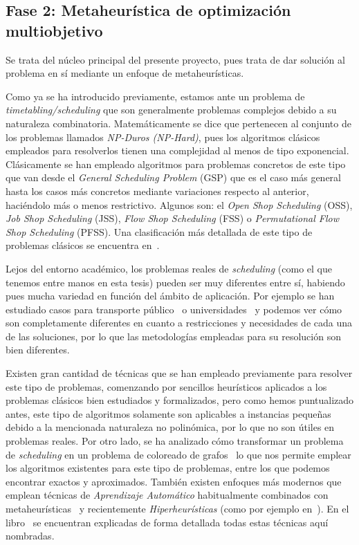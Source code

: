 \subsection{Fase 2: Metaheurística de optimización multiobjetivo} \label{sec:3:metaheurística}
Se trata del núcleo principal del presente proyecto, pues trata de dar solución al problema en sí mediante un enfoque de metaheurísticas.

Como ya se ha introducido previamente, estamos ante un problema de \textit{timetabling/scheduling} que son generalmente problemas complejos debido a su naturaleza combinatoria. 
Matemáticamente se dice que pertenecen al conjunto de los problemas llamados \textit{NP-Duros (NP-Hard)}, pues los algoritmos clásicos empleados para resolverlos tienen una complejidad al menos de tipo exponencial.
Clásicamente se han empleado algoritmos para problemas concretos de este tipo que van desde el \textit{General Scheduling Problem} (GSP) que es el caso más general hasta los casos más concretos mediante variaciones respecto al anterior, haciéndolo más o menos restrictivo. 
Algunos son: el \textit{Open Shop Scheduling} (OSS), \textit{Job Shop Scheduling} (JSS), \textit{Flow Shop Scheduling} (FSS) o \textit{Permutational Flow Shop Scheduling} (PFSS). Una clasificación más detallada de este tipo de problemas clásicos se encuentra en~\cite{sota:tesis-doctoral}. 

Lejos del entorno académico, los problemas reales de \textit{scheduling} (como el que tenemos entre manos en esta tesis) pueden ser muy diferentes entre sí, habiendo pues mucha variedad en función del ámbito de aplicación. 
Por ejemplo se han estudiado casos para transporte público~\cite{sota:transporte-publico} o universidades~\cite{sota:universidad} y podemos ver cómo son completamente diferentes en cuanto a restricciones y necesidades de cada una de las soluciones, por lo que las metodologías empleadas para su resolución son bien diferentes.

Existen gran cantidad de técnicas que se han empleado previamente para resolver este tipo de problemas, comenzando por sencillos heurísticos aplicados a los problemas clásicos bien estudiados y formalizados, pero como hemos puntualizado antes, este tipo de algoritmos solamente son aplicables a instancias pequeñas debido a la mencionada naturaleza no polinómica, por lo que no son útiles en problemas reales. Por otro lado, se ha analizado cómo transformar un problema de \textit{scheduling} en un problema de coloreado de grafos~\cite{sota:estudio-coloreado-grafos, sota:algotimo-coloreado-grafos} lo que nos permite emplear los algoritmos existentes para este tipo de problemas, entre los que podemos encontrar exactos y aproximados. También existen enfoques más modernos que emplean técnicas de \textit{Aprendizaje Automático} habitualmente combinados con metaheurísticas~\cite{sota:machine-learning-geneticos} y recientemente \textit{Hiperheurísticas} (como por ejemplo en~\cite{sota:hiperheuristicas}). En el libro~\cite{sota:libro-sota-scheduling} se encuentran explicadas de forma detallada todas estas técnicas aquí nombradas.

